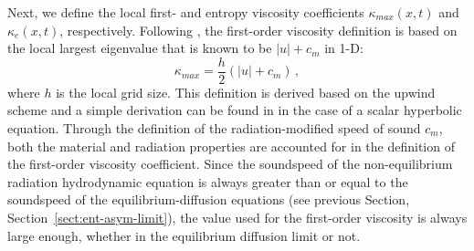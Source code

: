 \documentclass[review]{elsarticle}
\newcommand{\sect}[1]{Section~\ref{#1}}                     %
\begin{document}
Next, we define the local first- and entropy viscosity coefficients $\kappa_{max}(x,t)$ and $\kappa_e(x,t)$, respectively. Following \cite{valentin}, the first-order viscosity definition is based on the local largest eigenvalue that is known to be $|u| + c_m$ in 1-D:
\begin{equation}
\label{eq:equation8}
\kappa_{max} = \frac{h}{2} \left( |u| + c_m \right) \,,
\end{equation}  
where $h$ is the local grid size. This definition is derived based on the upwind scheme and a simple derivation can be found in \cite{jlg1} in the case of a scalar hyperbolic equation. Through the definition of the radiation-modified speed of sound $c_m$, both the material and radiation properties are accounted for in the definition of the first-order viscosity coefficient. Since the soundspeed of the non-equilibrium radiation hydrodynamic equation is always greater than or equal to the soundspeed of the equilibrium-diffusion equations (see previous Section, \sect{sect:ent-asym-limit}), the value used for the first-order viscosity is always large enough, whether in the equilibrium diffusion limit or not.
\end{document}
